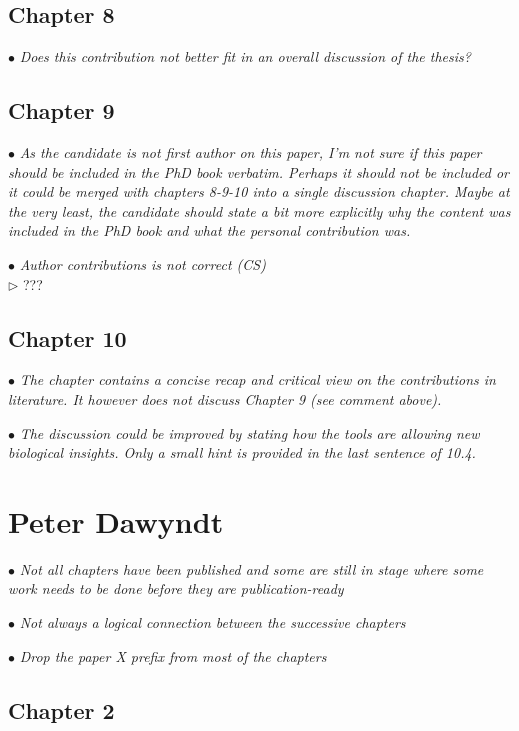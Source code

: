 \documentclass[10pt]{article}
\newcommand{\exam}[2][\  ]{\hspace{0pt}\marginpar{\color{red}#1}$\bullet$ \textit{#2}}
\newcommand{\imp}[1]{{\color{red} #1}}
\newcommand{\nimp}[1]{{\color{gray} #1}}
\newcommand{\answ}[1]{{\color{blue} $\triangleright$ #1}}
\newcommand{\bigexclaim}{\raisebox{-0.1em}{\BigTriangleUp}\hspace{-0.32em}\llap{\small\textbf{!}}\hspace{0.32em}}
\newcommand{\tagimp}{\bigexclaim}
\begin{document}
{\subsection{Chapter 8}
\exam{Does this contribution not better fit in an overall discussion of the thesis?}


\subsection{Chapter 9}
\exam[\tagimp]{\imp{As the candidate is not first author on this paper, I’m not sure if this paper
		should be included in the PhD book verbatim.} Perhaps it should not be
		included or it could be merged with chapters 8-9-10 into a single discussion
		chapter. Maybe at the very least, the candidate should state a bit more
		explicitly why the content was included in the PhD book and what the personal
		contribution was.}

\exam{Author contributions is not correct (CS)} \\
\answ{???}


\subsection{Chapter 10}

\exam{\nimp{The chapter contains a concise recap and critical view on the contributions in
		literature.} It however does not discuss Chapter 9 (see comment above).}


\exam{\imp{The discussion could be improved by stating how the tools are allowing new
		biological insights.} Only a small hint is provided in the last sentence of 10.4.}


\section{Peter Dawyndt}

\exam{Not all chapters have been published and some are still in stage where some work needs to be done before they are publication-ready}

\exam{Not always a logical connection between the successive chapters}


\exam{Drop the paper X prefix from most of the chapters}

\subsection{Chapter 2}


}
\end{document}
